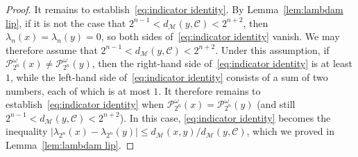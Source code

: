 \documentclass[11pt,reqno]{amsart}
\renewcommand{\le}{\leqslant}
\theoremstyle{remark}
\newcommand{\MM}{\mathcal{M}}
\newcommand{\sub}{\mathscr{C}}
\renewcommand{\1}{\mathbf 1}
\begin{document}
\begin{proof}
It remains to establish~\eqref{eq:indicator identity}. By Lemma~\ref{lem:lambdam lip}, if it is not the case that $2^{n-1}< d_{\MM}(y,\sub)< 2^{n+2}$, then $\lambda_n(x)=\lambda_n(y)=0$, so both sides of~\eqref{eq:indicator identity} vanish.  We may therefore assume that $2^{n-1}< d_{\MM}(y,\sub)< 2^{n+2}$. Under this assumption, if $\mathscr{P}_{2^n}^\omega(x)\neq \mathscr{P}_{2^n}^\omega(y)$, then the right-hand side of~\eqref{eq:indicator identity} is at least $1$, while the left-hand side of~\eqref{eq:indicator identity} consists of a sum of two numbers, each of which is at most $1$. It therefore remains to establish~\eqref{eq:indicator identity}  when $\mathscr{P}_{2^n}^\omega(x)= \mathscr{P}_{2^n}^\omega(y)$ (and still $2^{n-1}< d_{\MM}(y,\sub)< 2^{n+2}$). In this case, \eqref{eq:indicator identity} becomes the inequality $|\lambda_{2^n}(x)-\lambda_{2^n}(y)|\le d_{\MM}(x,y)/d_{\MM}(y,\sub)$, which we proved in Lemma~\ref{lem:lambdam lip}.
\end{proof}
\end{document}
